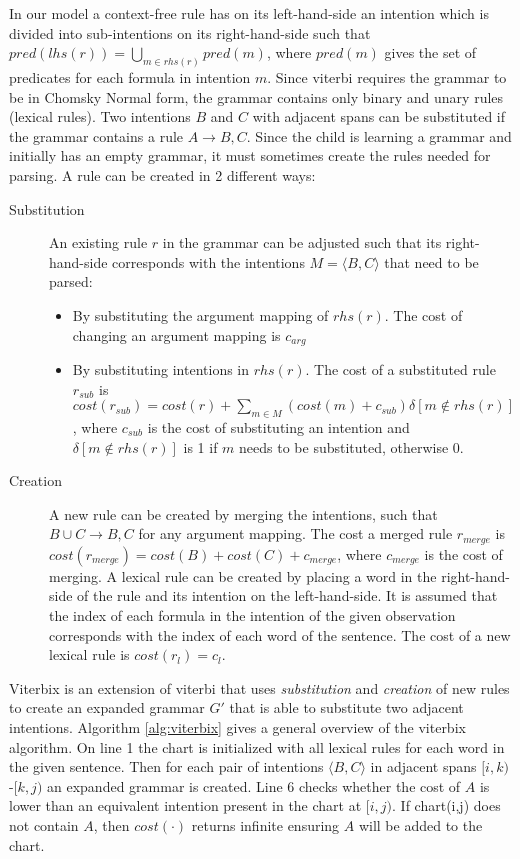 \documentclass[a4paper]{article}
\begin{document}
In our model a context-free rule has on its left-hand-side an intention which is divided into sub-intentions on its right-hand-side such that $pred(lhs(r)) =  \bigcup_{m \in rhs(r)} pred(m)$, where $pred(m)$ gives the set of predicates for each formula in intention $m$. Since viterbi requires the grammar to be in Chomsky Normal form, the grammar contains only binary and unary rules (lexical rules).  Two intentions $B$ and $C$ with adjacent spans can be substituted if the grammar contains a rule $A \rightarrow B, C$. Since the child is learning a grammar and initially has an empty grammar, it must sometimes create the rules needed for parsing. A rule can be created in 2 different ways:
\begin{description}
\item[Substitution] An existing rule $r$ in the grammar can be adjusted such that its right-hand-side corresponds with the intentions $M = \langle B, C \rangle$ that need to be parsed:
  \begin{itemize}
  \item By substituting the argument mapping of $rhs(r)$. The cost of changing an argument mapping is $c_{arg}$
  \item By substituting intentions in $rhs(r)$. The cost of a substituted rule $r_{sub}$ is $cost(r_{sub}) = cost(r) + \sum_{m \in M} (cost(m) + c_{sub}) \delta[m \notin rhs(r) ]$, where $c_{sub}$ is the cost of substituting an intention and $\delta[m \notin rhs(r) ]$ is 1 if $m$ needs to be substituted, otherwise 0.
  \end{itemize}
\item[Creation] A new rule can be created by merging the intentions, such that $B\cup C \rightarrow B, C$ for any argument mapping. The cost a merged rule $r_{merge}$ is $cost(r_{merge}) = cost(B) + cost(C) + c_{merge}$, where $c_{merge}$ is the cost of merging. A lexical rule can be created by placing a word in the right-hand-side of the rule and its intention on the left-hand-side. It is assumed that the index of each formula in the intention of the given observation corresponds with the index of each word of the sentence. The cost of a new lexical rule is $cost(r_l) = c_l$.
\end{description}

Viterbix is an extension of viterbi that uses \textit{substitution} and \textit{creation} of new rules to create an expanded grammar $G'$ that is able to substitute two adjacent intentions. Algorithm \ref{alg:viterbix} gives a general overview of the viterbix algorithm. On line 1 the chart is initialized with all lexical rules for each word in the given sentence. Then for each pair of intentions $\langle B, C \rangle$ in adjacent spans $[i,k)$-$[k,j)$ an expanded grammar is created. 
Line 6 checks whether the cost of $A$ is lower than an equivalent intention present in the chart at $[i,j)$. If chart(i,j) does not contain $A$, then $cost(\cdot)$ returns infinite ensuring $A$ will be added to the chart.
\end{document}
